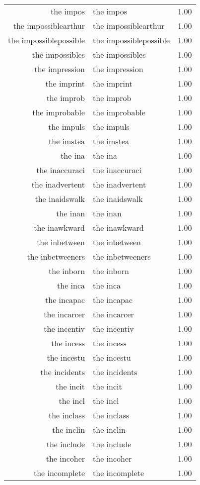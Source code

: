 \begin{table}[ht]
\begin{tabular}{rlr}
  the impos & the impos & 1.00 \\ 
  the impossiblearthur & the impossiblearthur & 1.00 \\ 
  the impossiblepossible & the impossiblepossible & 1.00 \\ 
  the impossibles & the impossibles & 1.00 \\ 
  the impression & the impression & 1.00 \\ 
  the imprint & the imprint & 1.00 \\ 
  the improb & the improb & 1.00 \\ 
  the improbable & the improbable & 1.00 \\ 
  the impuls & the impuls & 1.00 \\ 
  the imstea & the imstea & 1.00 \\ 
  the ina & the ina & 1.00 \\ 
  the inaccuraci & the inaccuraci & 1.00 \\ 
  the inadvertent & the inadvertent & 1.00 \\ 
  the inaidswalk & the inaidswalk & 1.00 \\ 
  the inan & the inan & 1.00 \\ 
  the inawkward & the inawkward & 1.00 \\ 
  the inbetween & the inbetween & 1.00 \\ 
  the inbetweeners & the inbetweeners & 1.00 \\ 
  the inborn & the inborn & 1.00 \\ 
  the inca & the inca & 1.00 \\ 
  the incapac & the incapac & 1.00 \\ 
  the incarcer & the incarcer & 1.00 \\ 
  the incentiv & the incentiv & 1.00 \\ 
  the incess & the incess & 1.00 \\ 
  the incestu & the incestu & 1.00 \\ 
  the incidents & the incidents & 1.00 \\ 
  the incit & the incit & 1.00 \\ 
  the incl & the incl & 1.00 \\ 
  the inclass & the inclass & 1.00 \\ 
  the inclin & the inclin & 1.00 \\ 
  the include & the include & 1.00 \\ 
  the incoher & the incoher & 1.00 \\ 
  the incomplete & the incomplete & 1.00 \\ 

\end{tabular}
\end{table}

